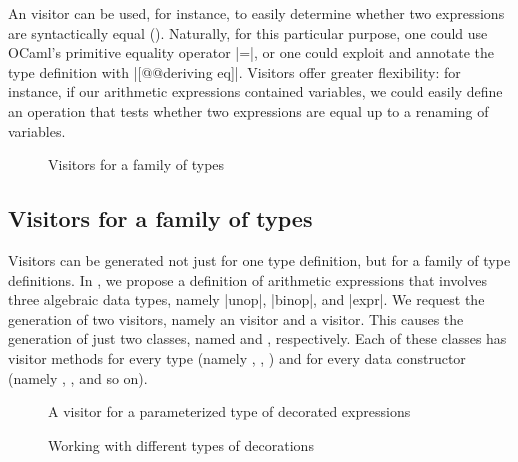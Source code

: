 \documentclass[11pt,a4paper,twoside]{article}
\begin{document}
An \itertwo visitor can be used, for instance, to easily determine whether two
expressions are syntactically equal (). Naturally, for this
particular purpose, one could use OCaml's primitive equality operator \oc|=|,
or one could exploit \ppxderiving and annotate the type definition with
\oc|[@@deriving eq]|. Visitors offer greater flexibility: for instance, if our
arithmetic expressions contained variables, we could easily define an
operation that tests whether two expressions are equal up to a renaming of
variables.


\begin{figure}[t]
\caption{Visitors for a family of types}
\label{fig:expr06}
\end{figure}

\subsection{Visitors for a family of types}
\label{sec:intro:family}

Visitors can be generated not just for one type definition, but for a family
of type definitions. In , we propose a definition of
arithmetic expressions that involves three algebraic data types, namely
\oc|unop|, \oc|binop|, and \oc|expr|. We request the generation of two
visitors, namely an \iter visitor and a \map visitor. This causes the
generation of just two classes, named \iter and \map, respectively. Each of
these classes has visitor methods for every type (namely ,
, ) and for every data constructor
(namely , , and so on).


\begin{figure}[p]
\vspace{-\baselineskip}
\caption{A visitor for a parameterized type of decorated expressions}
\label{fig:expr09}
\end{figure}

\begin{figure}[p]
\caption{Working with different types of decorations}
\label{fig:expr10}
\end{figure}
\end{document}
